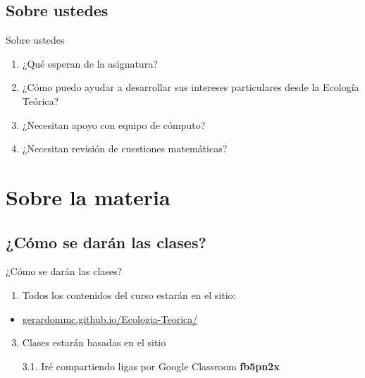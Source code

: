 \documentclass[
  11pt,
  ignorenonframetext,
]{beamer}
\providecommand{\tightlist}{%
  \setlength{\itemsep}{0pt}\setlength{\parskip}{0pt}}
\begin{document}
\hypertarget{sobre-ustedes}{%
\subsection{Sobre ustedes}\label{sobre-ustedes}}

\begin{frame}{Sobre ustedes}
\begin{enumerate}
\tightlist
\item
  ¿Qué esperan de la asignatura?
\item
  ¿Cómo puedo ayudar a desarrollar sus intereses particulares desde la
  Ecología Teórica?
\item
  ¿Necesitan apoyo con equipo de cómputo?
\item
  ¿Necesitan revisión de cuestiones matemáticas?
\end{enumerate}
\end{frame}

\hypertarget{sobre-la-materia}{%
\section{Sobre la materia}\label{sobre-la-materia}}

\hypertarget{cuxf3mo-se-daruxe1n-las-clases}{%
\subsection{¿Cómo se darán las
clases?}\label{cuxf3mo-se-daruxe1n-las-clases}}

\begin{frame}{¿Cómo se darán las clases?}
\begin{enumerate}
\tightlist
\item
  Todos los contenidos del curso estarán en el sitio:
\end{enumerate}

\begin{itemize}
\tightlist
\item
  \href{https://gerardommc.github.io/Ecologia-Teorica/}{gerardommc.github.io/Ecologia-Teorica/}
\end{itemize}

\begin{enumerate}
\setcounter{enumi}{2}
\item
  Clases estarán basadas en el sitio

  3.1. Iré compartiendo ligas por Google Classroom \textbf{fb5pn2x}
\end{enumerate}
\end{frame}
\end{document}
